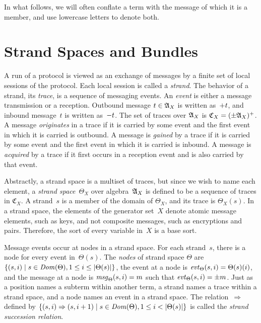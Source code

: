 \documentclass[12pt]{article}
\theoremstyle{definition}
\newcommand{\alga}{\alg{A}}
\newcommand{\tr}{\ensuremath{\mathfrak C}}
\newcommand{\sdom}{\fn{Dom}}
\newcommand{\evt}{\fn{evt}}
\newcommand{\msg}{\fn{msg}}
\begin{document}
In what follows, we will often conflate a term with the message of
which it is a member, and use lowercase letters to denote both.

\section{Strand Spaces and Bundles}\label{sec:strand spaces and bundles}

A run of a protocol is viewed as an exchange of messages by a finite
set of local sessions of the protocol.  Each local session is called a
\emph{strand}.  The behavior of a strand, its \emph{trace}, is a
sequence of messaging events.  An \emph{event} is either a message
transmission or a reception.  Outbound message $t\in\alga_X$ is
written as~$\mathord + t$, and inbound message~$t$ is written as~$\mathord -
t$.  The set of traces over $\alga_X$ is $\tr_X=(\pm\alga_X)^+$.  A
message \emph{originates} in a trace if it is carried by some event
and the first event in which it is carried is outbound.  A message is
\emph{gained} by a trace if it is carried by some event and the first
event in which it is carried is inbound.  A message is \emph{acquired}
by a trace if it first occurs in a reception event and is also carried
by that event.

Abstractly, a strand space is a multiset of traces, but since we wish
to name each element, a \emph{strand space}~$\Theta_X$ over
algebra~$\alga_X$ is defined to be a sequence of traces in $\tr_X$.  A
strand~$s$ is a member of the domain of $\Theta_X$, and its trace is
$\Theta_X(s)$.  In a strand space, the elements of the generator
set~$X$ denote atomic message elements, such as keys, and not
composite messages, such as encryptions and pairs.  Therefore, the
sort of every variable in~$X$ is a base sort.

Message events occur at nodes in a strand space.  For each strand~$s$,
there is a node for every event in~$\Theta(s)$.  The \emph{nodes} of
strand space $\Theta$ are $\{(s,i)\mid s\in\sdom(\Theta), 1\leq i\leq
|\Theta(s)|\}$, the event at a node is
$\evt_\Theta(s,i)=\Theta(s)(i)$, and the message at a node is
$\msg_\Theta(s,i) = m$ such that $\evt_\Theta(s,i) = \pm m$.  Just as
a position names a subterm within another term, a strand names a trace
within a strand space, and a node names an event in a strand space.
The relation~$\Rightarrow$ defined by $\{(s,i)\Rightarrow(s,i+1)\mid
s\in\sdom(\Theta), 1\leq i<|\Theta(s)|\}$ is called the \emph{strand
  succession relation}.
\end{document}
